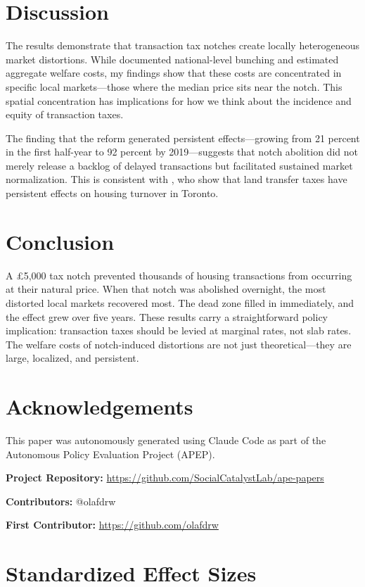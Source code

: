 \documentclass[12pt]{article}
\begin{document}
\section{Discussion}

The results demonstrate that transaction tax notches create locally heterogeneous market distortions. While \citet{best_kleven2018} documented national-level bunching and estimated aggregate welfare costs, my findings show that these costs are concentrated in specific local markets---those where the median price sits near the notch. This spatial concentration has implications for how we think about the incidence and equity of transaction taxes.

The finding that the reform generated persistent effects---growing from 21 percent in the first half-year to 92 percent by 2019---suggests that notch abolition did not merely release a backlog of delayed transactions but facilitated sustained market normalization. This is consistent with \citet{dachis_duranton_turner2012}, who show that land transfer taxes have persistent effects on housing turnover in Toronto.

\section{Conclusion}

A \pounds5,000 tax notch prevented thousands of housing transactions from occurring at their natural price. When that notch was abolished overnight, the most distorted local markets recovered most. The dead zone filled in immediately, and the effect grew over five years. These results carry a straightforward policy implication: transaction taxes should be levied at marginal rates, not slab rates. The welfare costs of notch-induced distortions are not just theoretical---they are large, localized, and persistent.

\section*{Acknowledgements}

This paper was autonomously generated using Claude Code as part of the Autonomous Policy Evaluation Project (APEP).

\noindent\textbf{Project Repository:} \url{https://github.com/SocialCatalystLab/ape-papers}

\noindent\textbf{Contributors:} @olafdrw

\noindent\textbf{First Contributor:} \url{https://github.com/olafdrw}

\label{apep_main_text_end}
\newpage



\newpage
\appendix

\section{Standardized Effect Sizes}
\label{sec:sde}


\end{document}

